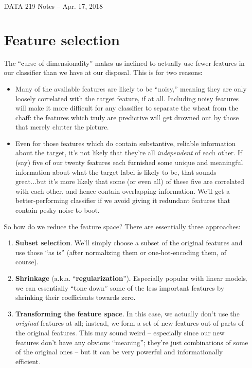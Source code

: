 \documentclass[12pt]{article}
\begin{document}
\begin{center}
\begin{Large}
DATA 219 Notes -- Apr. 17, 2018
\end{Large}
\end{center}

\section{Feature selection}

The ``curse of dimensionality'' makes us inclined to actually use fewer
features in our classifier than we have at our disposal. This is for two
reasons:

\begin{itemize}
\itemsep.1em
\item Many of the available features are likely to be ``noisy,'' meaning they
are only loosely correlated with the target feature, if at all. Including
noisy features will make it more difficult for any classifier to separate the
wheat from the chaff: the features which truly are predictive will get drowned
out by those that merely clutter the picture.

\item Even for those features which do contain substantive, reliable
information about the target, it's not likely that they're all
\textit{independent} of each other. If (say) five of our twenty features each
furnished some unique and meaningful information about what the target label
is likely to be, that sounds great...but it's more likely that some (or even
all) of these five are correlated with each other, and hence contain
overlapping information. We'll get a better-performing classifier if we
avoid giving it redundant features that contain pesky noise to boot.

\end{itemize}

So how do we reduce the feature space? There are essentially three approaches:

\begin{enumerate}
\itemsep.1em
\item \textbf{Subset selection}. We'll simply choose a subset of the original
features and use those ``as is'' (after normalizing them or one-hot-encoding
them, of course).
\item \textbf{Shrinkage} (a.k.a. ``\textbf{regularization}''). Especially
popular with linear models, we can essentially ``tone down'' some of the less
important features by shrinking their coefficients towards zero.
\item \textbf{Transforming the feature space}. In this case, we actually don't
use the \textit{original} features at all; instead, we form a set of
new features out of parts of the original features. This may sound weird --
especially since our new features don't have any obvious ``meaning''; they're
just combinations of some of the original ones -- but it can be very powerful
and informationally efficient.
\end{enumerate}
\end{document}
